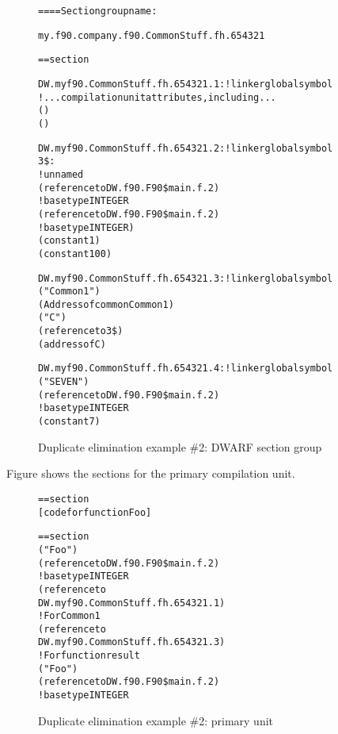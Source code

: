 \begin{figure}
\begin{dwflisting}
\begin{alltt}
==== Section group name:

    my.f90.company.f90.CommonStuff.fh.654321

== section \dotdebuginfo{}

DW.myf90.CommonStuff.fh.654321.1:    ! linker global symbol
    \DWTAGpartialunit
        ! ...compilation unit attributes, including...
        \DWATlanguage(\DWLANGFortranninety)
        \DWATidentifiercase(\DWIDcaseinsensitive)

DW.myf90.CommonStuff.fh.654321.2:    ! linker global symbol
3\$: \DWTAGarraytype
        ! unnamed
        \DWATtype(reference to DW.f90.F90\$main.f.2)
            ! base type INTEGER
        \DWTAGsubrangetype
            \DWATtype(reference to DW.f90.F90\$main.f.2)
                ! base type INTEGER)
            \DWATlowerbound(constant 1)
            \DWATupperbound(constant 100)

DW.myf90.CommonStuff.fh.654321.3:    ! linker global symbol
    \DWTAGcommonblock
        \DWATname("Common1")
        \DWATlocation(Address of common  Common1)
        \DWTAGvariable
            \DWATname("C")
            \DWATtype(reference to 3\$)
            \DWATlocation(address of C)

DW.myf90.CommonStuff.fh.654321.4:    ! linker global symbol
    \DWTAGconstant
        \DWATname("SEVEN")
        \DWATtype(reference to DW.f90.F90\$main.f.2)
            ! base type INTEGER
        \DWATconstvalue(constant 7)
\end{alltt}
\end{dwflisting}
\caption{Duplicate elimination example \#2: DWARF section group}
\label{fig:duplicateeliminationexample2dwarfsectiongroup}
\end{figure}

Figure 
shows the sections for the primary compilation unit.

\begin{figure}
\begin{dwflisting}
\begin{alltt}
== section \dottext{}
    [code for function Foo]

== section \dotdebuginfo{}
    \DWTAGcompileunit
        \DWTAGsubprogram
            \DWATname("Foo")
            \DWATtype(reference to DW.f90.F90\$main.f.2)
                ! base type INTEGER
            \DWTAGimportedunit
                \DWATimport(reference to
                    DW.myf90.CommonStuff.fh.654321.1)
            \DWTAGcommoninclusion ! For Common1
                \DWATcommonreference(reference to
                    DW.myf90.CommonStuff.fh.654321.3)
            \DWTAGvariable ! For function result
                \DWATname("Foo")
                    \DWATtype(reference to DW.f90.F90\$main.f.2)
                        ! base type INTEGER
\end{alltt}
\end{dwflisting}
\caption{Duplicate elimination example \#2: primary unit}
\label{fig:duplicateeliminationexample2primaryunit}
\end{figure}

